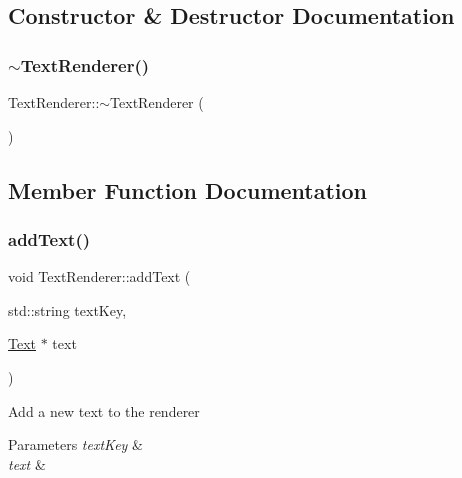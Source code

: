 \subsection{Constructor \& Destructor Documentation}
\mbox{\label{class_text_renderer_a7087505bdc31e41416408c27fe029f20}} 
\subsubsection{\texorpdfstring{$\sim$\+Text\+Renderer()}{~TextRenderer()}}
{\footnotesize\ttfamily Text\+Renderer\+::$\sim$\+Text\+Renderer (\begin{DoxyParamCaption}{ }\end{DoxyParamCaption})}



\subsection{Member Function Documentation}
\mbox{\label{class_text_renderer_af174d80bebf4e0eb8a9039bc7466893e}} 
\subsubsection{\texorpdfstring{add\+Text()}{addText()}}
{\footnotesize\ttfamily void Text\+Renderer\+::add\+Text (\begin{DoxyParamCaption}\item[{std\+::string}]{text\+Key,  }\item[{\mbox{\hyperlink{class_text}{Text}} $\ast$}]{text }\end{DoxyParamCaption})}



Add a new text to the renderer 


\begin{DoxyParams}{Parameters}
{\em text\+Key} & \\
\hline
{\em text} & \\
\hline
\end{DoxyParams}
\mbox{\label{class_text_renderer_a58d44a6db6f6410a6ec292b811f774a2}} 
